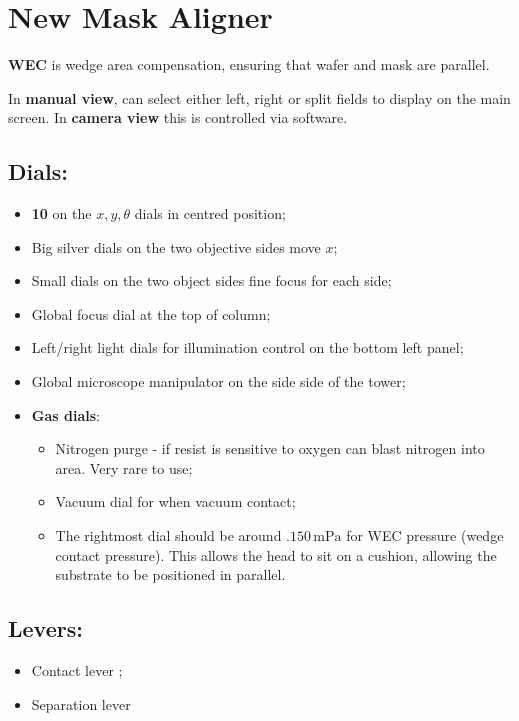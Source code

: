 \section{New Mask Aligner}\label{sec:new-mask-aligner}

\textbf{WEC} is wedge area compensation, ensuring that wafer and mask are
parallel.

In \textbf{manual view}, can select either left, right or split fields to
display on the main screen. In \textbf{camera view} this is controlled via
software.

\subsection{Dials:}

\begin{itemize}
  \item \textbf{10} on the $x, y, \theta$ dials in centred position;
  \item Big silver dials on the two objective sides move $x$;
  \item Small dials on the two object sides fine focus for each side;
  \item Global focus dial at the top of column;
  \item Left/right light dials for illumination control on the bottom left
        panel;
  \item Global microscope manipulator on the side side of the tower;
  \item \textbf{Gas dials}:
        \begin{itemize}
          \item Nitrogen purge - if resist is sensitive to oxygen can blast
                nitrogen into area. Very rare to use;
          \item Vacuum dial for when vacuum contact;
          \item The rightmost dial should be around $.150\,\text{mPa}$ for WEC
                pressure (wedge contact pressure). This allows the head to sit
                on a cushion, allowing the substrate to be positioned in
                parallel.
        \end{itemize}
\end{itemize}

\subsection{Levers:}

\begin{itemize}
  \item Contact lever ;
  \item Separation lever
\end{itemize}


